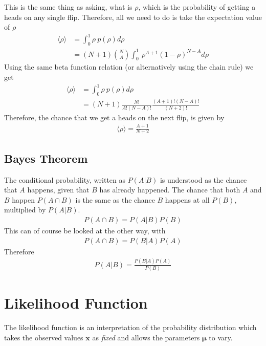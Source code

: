 This is the same thing as asking, what is $\rho$, which is the probability of getting a heads on any single flip. Therefore, all we need to do is take the expectation value of $\rho$
\begin{align}
	\langle \rho\rangle &= \int_0^1\rho ~p(\rho) d\rho\\
	&= (N+1)\binom{N}{A}\int_0^1 ~\rho^{A+1}(1-\rho)^{N-A} d\rho
\end{align}
Using the same beta function relation (or alternatively using the chain rule) we get
\begin{align}
	\langle \rho\rangle &= \int_0^1\rho ~p(\rho) d\rho\\
	&= (N+1)\frac{N!}{A!(N-A)!}\frac{(A+1)!(N-A)!}{(N+2)!}
\end{align}
Therefore, the chance that we get a heads on the next flip, is given by
\begin{align}
	\langle\rho\rangle = \frac{A+1}{N+2}
\end{align}



\subsection{Bayes Theorem}
The conditional probability, written as $P(A|B)$ is understood as the chance that $A$ happens, given that $B$ has already happened. The chance that both $A$ and $B$ happen $P(A \cap B)$ is the same as the chance $B$ happens at all $P(B)$, multiplied by $P(A|B)$.
\begin{align}
P(A\cap B) = P(A|B)P(B)
\end{align}
This can of course be looked at the other way, with
\begin{align}
P(A\cap B) = P(B|A)P(A)
\end{align}
Therefore
\begin{align}
P(A|B) = \frac{P(B|A)P(A)}{P(B)}
\end{align}

\section{Likelihood Function}

The likelihood function is an interpretation of the probability distribution which takes the observed values $\textbf{x}$ as \textit{fixed} and allows the parameters $\boldsymbol{\mu}$ to vary.

